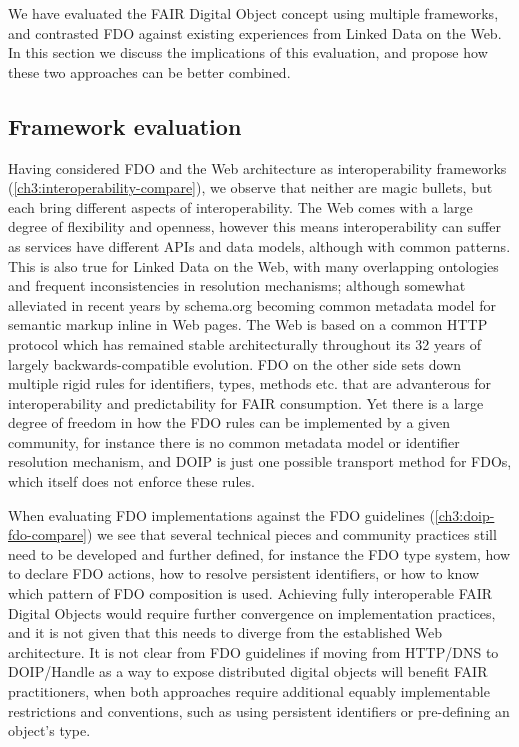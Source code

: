 We have evaluated the FAIR Digital Object concept using multiple frameworks, and contrasted FDO against existing experiences from Linked Data on the Web. In this section we discuss the implications of this evaluation, and propose how these two approaches can be better combined.

\subsection{Framework evaluation}

Having considered FDO and the Web architecture as interoperability frameworks (\vref*{ch3:interoperability-compare}), we observe that neither are magic bullets, but each bring different aspects of interoperability. The Web comes with a large degree of flexibility and openness, however this means interoperability can suffer as services have different APIs and data models, although with common patterns. This is also true for Linked Data on the Web, with many overlapping ontologies and frequent inconsistencies in resolution mechanisms; although somewhat alleviated in recent years by schema.org becoming common metadata model for semantic markup inline in Web pages. The Web is based on a common HTTP protocol which has remained stable architecturally throughout its 32 years of largely backwards-compatible evolution. FDO on the other side sets down multiple rigid rules for identifiers, types, methods etc. that are advanterous for interoperability and predictability for FAIR consumption. Yet there is a large degree of freedom in how the FDO rules can be implemented by a given community, for instance there is no common metadata model or identifier resolution mechanism, and DOIP is just one possible transport method for FDOs, which itself does not enforce these rules. 

When evaluating FDO implementations against the FDO guidelines (\vref*{ch3:doip-fdo-compare}) we see that several technical pieces and community practices still need to be developed and further defined, for instance the FDO type system, how to declare FDO actions, how to resolve persistent identifiers, or how to know which pattern of FDO composition is used. Achieving fully interoperable FAIR Digital Objects would require further convergence on implementation practices, and it is not given that this needs to diverge from the established Web architecture.  It is not clear from FDO guidelines if moving from HTTP/DNS to DOIP/Handle as a way to expose distributed digital objects will benefit FAIR practitioners, when both approaches require additional equably implementable restrictions and conventions, such as using persistent identifiers or pre-defining an object's type. 

